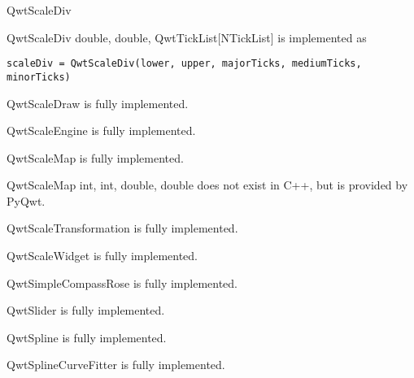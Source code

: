 \documentclass{manual}
\begin{document}
{\begin{classdesc*}{QwtScaleDiv}
  \begin{cfuncdesc}{}
    {QwtScaleDiv}{
      double,
      double,
      QwtTickList[NTickList]}
    is implemented as
    \begin{verbatim}
scaleDiv = QwtScaleDiv(lower, upper, majorTicks, mediumTicks, minorTicks)
    \end{verbatim}
  \end{cfuncdesc}

\end{classdesc*}

\begin{classdesc*}{QwtScaleDraw}
  is fully implemented.
\end{classdesc*}

\begin{classdesc*}{QwtScaleEngine}
  is fully implemented.
\end{classdesc*}

\begin{classdesc*}{QwtScaleMap}
  is fully implemented.

  \begin{cfuncdesc}{}
    {QwtScaleMap}{
      int,
      int,
      double,
      double}
    does not exist in C++, but is provided by PyQwt. 
  \end{cfuncdesc}
\end{classdesc*}

\begin{classdesc*}{QwtScaleTransformation}
  is fully implemented.
\end{classdesc*}

\begin{classdesc*}{QwtScaleWidget}
  is fully implemented.
\end{classdesc*}

\begin{classdesc*}{QwtSimpleCompassRose}
  is fully implemented.
\end{classdesc*}

\begin{classdesc*}{QwtSlider}
  is fully implemented.
\end{classdesc*}

\begin{classdesc*}{QwtSpline}
  is fully implemented.
\end{classdesc*}

\begin{classdesc*}{QwtSplineCurveFitter}
  is fully implemented.
\end{classdesc*}
 
}
\end{document}
